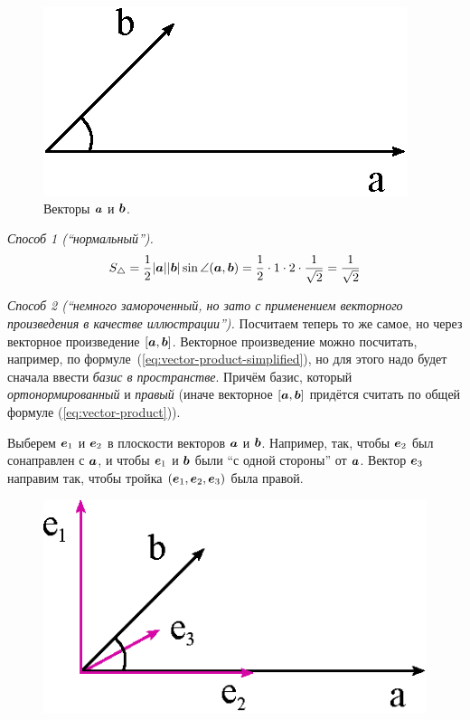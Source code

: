 \documentclass[a4paper,12pt]{article}
\begin{document}
  \begin{solution}
    \begin{figure}[h]
      \centering
      
      \includegraphics[width=0.35\columnwidth]{a-and-b-from-one-point}
      
      \caption{Векторы $\boldsymbol a$ и $\boldsymbol b$.}
      \label{fig:a-and-b-from-one-point}
    \end{figure}
    
    \leavevmode
    
    \emph{Способ 1 (``нормальный'').}
    \[
      S_{\triangle} = \frac{1}{2} |\boldsymbol a| |\boldsymbol b| \sin \angle{(\boldsymbol a, \boldsymbol b)} = \frac{1}{2} \cdot 1 \cdot 2 \cdot \frac{1}{\sqrt{2}} = \frac{1}{\sqrt{2}}
    \]
    
    \medskip
    
    \emph{Способ 2 (``немного замороченный, но зато с применением векторного произведения в качестве иллюстрации'').}
    Посчитаем теперь то же самое, но через векторное произведение $[\boldsymbol a, \boldsymbol b]$.
    Векторное произведение можно посчитать, например, по формуле~(\ref{eq:vector-product-simplified}), но для этого надо будет сначала ввести \emph{базис в пространстве}.
    Причём базис, который \emph{ортонормированный} и \emph{правый} (иначе векторное $[\boldsymbol a, \boldsymbol b]$ придётся считать по общей формуле (\ref{eq:vector-product})).
    
    Выберем $\boldsymbol e_1$ и $\boldsymbol e_2$ в плоскости векторов $\boldsymbol a$ и $\boldsymbol b$.
    Например, так, чтобы $\boldsymbol e_2$ был сонаправлен с $\boldsymbol a$, и чтобы $\boldsymbol e_1$ и $\boldsymbol b$ были ``с одной стороны'' от $\boldsymbol a$.
    Вектор $\boldsymbol e_3$ направим так, чтобы тройка $(\boldsymbol e_1, \boldsymbol e_2, \boldsymbol e_3)$ была правой.
    
    \begin{figure}[h]
      \centering
      
      \includegraphics[width=0.35\columnwidth]{a-and-b-from-one-point-with-basis}
      

\end{figure}
\end{solution}
\end{document}
